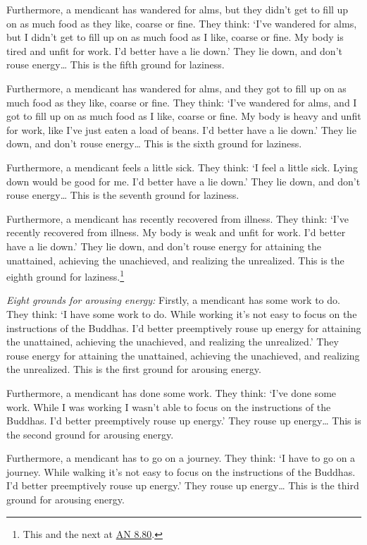 \documentclass[12pt,openany]{book}%
\begin{document}
Furthermore, a mendicant has wandered for alms, but they didn’t get to fill up on as much food as they like, coarse or fine. They think: ‘I’ve wandered for alms, but I didn’t get to fill up on as much food as I like, coarse or fine. My body is tired and unfit for work. I’d better have a lie down.’ They lie down, and don’t rouse energy… This is the fifth ground for laziness. 

Furthermore, a mendicant has wandered for alms, and they got to fill up on as much food as they like, coarse or fine. They think: ‘I’ve wandered for alms, and I got to fill up on as much food as I like, coarse or fine. My body is heavy and unfit for work, like I’ve just eaten a load of beans. I’d better have a lie down.’ They lie down, and don’t rouse energy… This is the sixth ground for laziness. 

Furthermore, a mendicant feels a little sick. They think: ‘I feel a little sick. Lying down would be good for me. I’d better have a lie down.’ They lie down, and don’t rouse energy… This is the seventh ground for laziness. 

Furthermore, a mendicant has recently recovered from illness. They think: ‘I’ve recently recovered from illness. My body is weak and unfit for work. I’d better have a lie down.’ They lie down, and don’t rouse energy for attaining the unattained, achieving the unachieved, and realizing the unrealized. This is the eighth ground for laziness.\footnote{This and the next at \href{https://suttacentral.net/an8.80/en/sujato}{AN 8.80}. } 

\emph{Eight grounds for arousing energy:} Firstly, a mendicant has some work to do. They think: ‘I have some work to do. While working it’s not easy to focus on the instructions of the Buddhas. I’d better preemptively rouse up energy for attaining the unattained, achieving the unachieved, and realizing the unrealized.’ They rouse energy for attaining the unattained, achieving the unachieved, and realizing the unrealized. This is the first ground for arousing energy. 

Furthermore, a mendicant has done some work. They think: ‘I’ve done some work. While I was working I wasn’t able to focus on the instructions of the Buddhas. I’d better preemptively rouse up energy.’ They rouse up energy… This is the second ground for arousing energy. 

Furthermore, a mendicant has to go on a journey. They think: ‘I have to go on a journey. While walking it’s not easy to focus on the instructions of the Buddhas. I’d better preemptively rouse up energy.’ They rouse up energy… This is the third ground for arousing energy. 
\end{document}
